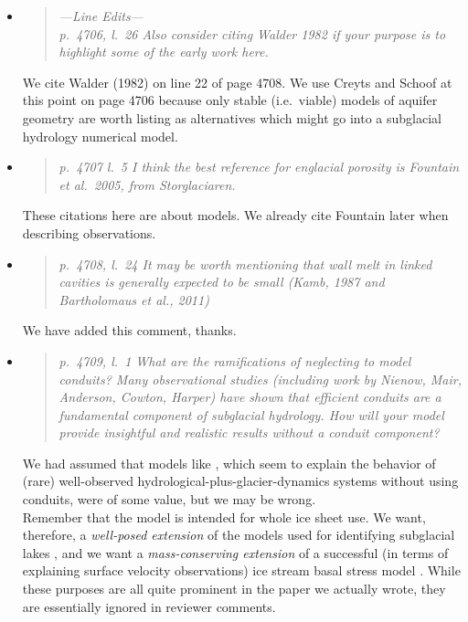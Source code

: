 \documentclass[11pt,reqno]{amsart}
\newcommand{\reply}[2]{
\medskip\medskip
\item  \begin{quote}
\emph{#1}
\end{quote}

\medskip
\noindent #2}
\begin{document}
\begin{itemize}
\reply{---Line Edits---\\
p.~4706, l.~26 Also consider citing Walder 1982 if your purpose is to highlight some of
the early work here.}
{We cite Walder (1982) on line 22 of page 4708.  We use Creyts and Schoof at this point on page 4706 because only stable (i.e.~viable) models of aquifer geometry are worth listing as alternatives which might go into a subglacial hydrology numerical model.}

\reply{p.~4707 l.~5 I think the best reference for englacial porosity is Fountain et al.~2005, from Storglaciaren.}
{These citations here are about models.  We already cite Fountain later when describing observations.}

\reply{p.~4708, l.~24 It may be worth mentioning that wall melt in linked cavities is generally
expected to be small (Kamb, 1987 and Bartholomaus et al., 2011)}
{We have added this comment, thanks.}

\reply{p.~4709, l.~1 What are the ramifications of neglecting to model conduits? Many observational studies (including work by Nienow, Mair, Anderson, Cowton, Harper) have
shown that efficient conduits are a fundamental component of subglacial hydrology.
How will your model provide insightful and realistic results without a conduit component?}
{We had assumed that models like \cite{Bartholomausetal2011}, which seem to explain the behavior of (rare) well-observed hydrological-plus-glacier-dynamics systems without using conduits, were of some value, but we may be wrong.\\
\indent Remember that the model is intended for whole ice sheet use.  We want, therefore, a \emph{well-posed extension} of the models used for identifying subglacial lakes \cite{LeBrocqetal2009,Siegertetal2009}, and we want a \emph{mass-conserving extension} of a successful (in terms of explaining surface velocity observations) ice stream basal stress model \cite{AschwandenAdalgeirsdottirKhroulev,BBssasliding,Tulaczyketal2000}.  While these purposes are all quite prominent in the paper we actually wrote, they are essentially ignored in reviewer comments.}


\end{itemize}
\end{document}
